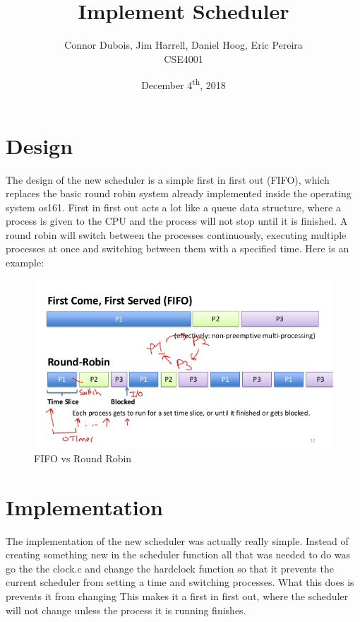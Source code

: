 \documentclass[12pt]{article}
\newcommand\tab[1][1cm]{\hspace*{#1}}
\begin{document}
	

\begin{titlepage}
	
\author{Connor Dubois, Jim Harrell, Daniel Hoog,  Eric Pereira\\
CSE4001 }
\date{December 4\textsuperscript{th}, 2018}
\title{Implement Scheduler}

\maketitle

\end{titlepage}

\tableofcontents

\newpage {}

\section{Design}
\tab The design of the new scheduler is a simple first in first out (FIFO), which replaces the basic round robin system already implemented inside the operating system os161. First in first out acts a lot like a queue data structure, where a process is given to the CPU and the process will not stop until it is finished. A round robin will switch between the processes continuously, executing multiple processes at once and switching between them with a specified time. Here is an example: \\
\begin{figure}[ht!]
	\centering
	\includegraphics[width=120mm]{fifovsrr.jpg}
	\caption{FIFO vs Round Robin }
\end{figure}
\label{fig:FIFOVSRR}

\section{Implementation}
\tab The implementation of the new scheduler was actually really simple.  Instead of creating something new in the scheduler function all that was needed to do was go the the clock.c and change the hardclock function so that it prevents the current scheduler from setting a time and switching processes. What this does is prevents it from changing  This makes it a first in first out, where the scheduler will not change unless the process it is running finishes. 
\end{document}
